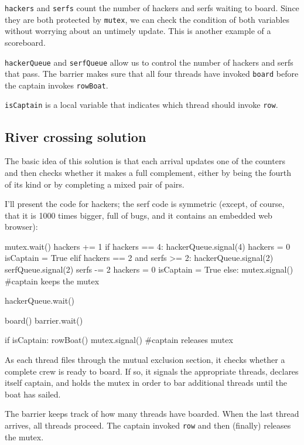 \documentclass{book}
\begin{document}
{\tt hackers} and {\tt serfs} count the number of hackers
and serfs waiting to board.  Since they are both protected by
    {\tt mutex}, we can check the condition of both variables without
worrying about an untimely update.  This is another example
of a scoreboard.

    {\tt hackerQueue} and {\tt serfQueue} allow us to control the number
of hackers and serfs that pass.  The barrier
makes sure that all four threads have invoked
    {\tt board} before the captain invokes {\tt rowBoat}.

{\tt isCaptain} is a local variable that
indicates which thread should invoke {\tt row}.


\subsection {River crossing solution}

The basic idea of this solution is that each arrival updates
one of the counters and then checks whether it makes a
full complement, either by being the fourth of its kind or
by completing a mixed pair of pairs.

I'll present the code for hackers; the serf code is
symmetric (except, of course, that it is 1000 times bigger,
full of bugs, and it contains an embedded web browser):


\begin{unbreakable}[title={River crossing solution}]{}
mutex.wait()
 hackers += 1
 if hackers == 4:
  hackerQueue.signal(4)                
  hackers = 0
  isCaptain = True
 elif hackers == 2 and serfs >= 2:
  hackerQueue.signal(2)                
  serfQueue.signal(2)                  
  serfs -= 2
  hackers = 0
  isCaptain = True
 else:
  mutex.signal() #captain keeps the mutex

hackerQueue.wait()           

board()
barrier.wait()            

if isCaptain:
 rowBoat()
 mutex.signal() #captain releases mutex
\end{unbreakable}

As each thread files through the mutual exclusion section, it
checks whether a complete crew is ready to board.  If so, it
signals the appropriate threads, declares itself captain, and
holds the mutex in order to bar additional threads until the
boat has sailed.

The barrier keeps track of how many threads have boarded.
When the last thread arrives, all threads proceed.
The captain invoked {\tt row} and then (finally) releases the mutex.
\end{document}
